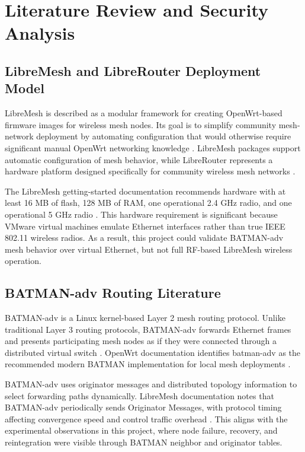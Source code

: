 \documentclass[conference]{IEEEtran}
\begin{document}
\section{Literature Review and Security Analysis}

\subsection{LibreMesh and LibreRouter Deployment Model}

LibreMesh is described as a modular framework for creating OpenWrt-based firmware images for wireless mesh nodes. Its goal is to simplify community mesh-network deployment by automating configuration that would otherwise require significant manual OpenWrt networking knowledge \cite{libremeshdocs}. LibreMesh packages support automatic configuration of mesh behavior, while LibreRouter represents a hardware platform designed specifically for community wireless mesh networks \cite{limerouteredt}.

The LibreMesh getting-started documentation recommends hardware with at least 16 MB of flash, 128 MB of RAM, one operational 2.4 GHz radio, and one operational 5 GHz radio \cite{libremeshgettingstarted}. This hardware requirement is significant because VMware virtual machines emulate Ethernet interfaces rather than true IEEE 802.11 wireless radios. As a result, this project could validate BATMAN-adv mesh behavior over virtual Ethernet, but not full RF-based LibreMesh wireless operation.

\subsection{BATMAN-adv Routing Literature}

BATMAN-adv is a Linux kernel-based Layer 2 mesh routing protocol. Unlike traditional Layer 3 routing protocols, BATMAN-adv forwards Ethernet frames and presents participating mesh nodes as if they were connected through a distributed virtual switch \cite{batmanadvdocs}. OpenWrt documentation identifies batman-adv as the recommended modern BATMAN implementation for local mesh deployments \cite{openwrtbatman}.

BATMAN-adv uses originator messages and distributed topology information to select forwarding paths dynamically. LibreMesh documentation notes that BATMAN-adv periodically sends Originator Messages, with protocol timing affecting convergence speed and control traffic overhead \cite{libremeshprotocols}. This aligns with the experimental observations in this project, where node failure, recovery, and reintegration were visible through BATMAN neighbor and originator tables.
\end{document}

